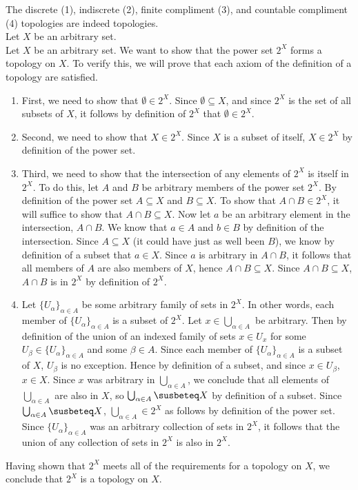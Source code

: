 \documentclass{article}
\theoremstyle{definition}
\begin{document}
 The discrete (1), indiscrete (2), finite compliment (3), and countable compliment (4) topologies are indeed topologies.\\
Let $X$ be an arbitrary set.\\
 Let $X$ be an arbitrary set. We want to show that the power set $2^X$ forms a topology on $X$. To verify this, we will prove that each axiom of the definition of a topology are satisfied.
\begin{enumerate}
    \item First, we need to show that $\emptyset\in 2^X$. Since $\emptyset\subseteq X$, and since $2^X$ is the set of all subsets of $X$, it follows by definition of $2^X$ that $\emptyset \in 2^X$.
    \item Second, we need to show that $X\in 2^X$. Since $X$ is a subset of itself, $X\in 2^X$ by definition of the power set.
    \item Third, we need to show that the intersection of any elements of $2^X$ is itself in $2^X$. To do this, let $A$ and $B$ be arbitrary members of the power set $2^X$. By definition of the power set $A\subseteq X$ and $B\subseteq X$. To show that $A\cap B\in 2^X$, it will suffice to show that $A\cap B\subseteq X$. Now let $a$ be an arbitrary element in the intersection, $A\cap B$. We know that $a\in A$ and $b\in B$ by definition of the intersection. Since $A\subseteq X$ (it could have just as well been $B$), we know by definition of a subset that $a\in X$. Since $a$ is arbitrary in $A\cap B$, it follows that all members of $A$ are also members of $X$, hence $A\cap B\subseteq X$. Since $A\cap B\subseteq X$, $A\cap B$ is in $2^X$ by definition of $2^X$.
    \item Let $\{U_\alpha\}_{\alpha\in A}$ be some arbitrary family of sets in $2^X$. In other words, each member of $\{U_\alpha\}_{\alpha\in A}$ is a subset of $2^X$. Let $x\in \bigcup_{\alpha\in A}$ be arbitrary. Then by definition of the union of an indexed family of sets $x\in U_x$ for some $U_\beta \in \{U_\alpha\}_{\alpha\in A}$ and some $\beta \in A$. Since each member of $\{U_\alpha\}_{\alpha\in A}$ is a subset of $X$, $U_\beta$ is no exception. Hence by definition of a subset, and since $x\in U_\beta$, $x\in X$. Since $x$ was arbitrary in $\bigcup_{\alpha\in A}$, we conclude that all elements of $\bigcup_{\alpha\in A}$ are also in $X$, so $\bigcup_{\alpha\in A} \susbeteq X$ by definition of a subset. Since $\bigcup_{\alpha\in A}\susbeteq X$, $\bigcup_{\alpha\in A}\in 2^X$ as follows by definition of the power set. Since $\{U_\alpha\}_{\alpha\in A}$ was an arbitrary collection of sets in $2^X$, it follows that the union of any collection of sets in $2^X$ is also in $2^X$.
\end{enumerate}
Having shown that $2^X$ meets all of the requirements for a topology on $X$, we conclude that $2^X$ is a topology on $X$.\\
\end{document}
